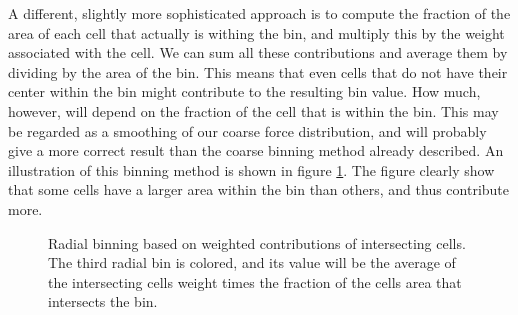\documentclass[twoside,english]{uiofysmaster}
\begin{document}
A different, slightly more sophisticated approach is to compute the fraction of the area of each cell that actually is withing the bin, and multiply this by the weight associated with the cell.
We can sum all these contributions and average them by dividing by the area of the bin. 
This means that even cells that do not have their center within the bin might contribute to the resulting bin value. 
How much, however, will depend on the fraction of the cell that is within the bin.
This may be regarded as a smoothing of our coarse force distribution, and will probably give a more correct result than the coarse binning method already described. An illustration of this binning method is shown in figure \ref{fig:radialBinningSmooth}.
The figure clearly show that some cells have a larger area within the bin than others, and thus contribute more. 

{\color{editColor}{\Huge Computing the area of the cell within the bin should be described here!}}


 
 
 

\begin{figure}
    \centering
	\resizebox{0.5\linewidth}{!}{
		
	}
	\caption{Radial binning based on weighted contributions of intersecting cells. The third radial bin is colored, and its value will be the average of the intersecting cells weight times the fraction of the cells area that intersects the bin.}%
	\label{fig:radialBinningSmooth}
%		
\end{figure}
\end{document}
